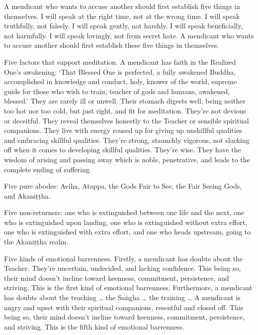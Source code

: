 \documentclass[12pt,openany]{book}%
\begin{document}
A mendicant who wants to accuse another should first establish five things in themselves. I will speak at the right time, not at the wrong time. I will speak truthfully, not falsely. I will speak gently, not harshly. I will speak beneficially, not harmfully. I will speak lovingly, not from secret hate. A mendicant who wants to accuse another should first establish these five things in themselves. 

Five factors that support meditation. A mendicant has faith in the Realized One’s awakening: ‘That Blessed One is perfected, a fully awakened Buddha, accomplished in knowledge and conduct, holy, knower of the world, supreme guide for those who wish to train, teacher of gods and humans, awakened, blessed.’ They are rarely ill or unwell. Their stomach digests well, being neither too hot nor too cold, but just right, and fit for meditation. They’re not devious or deceitful. They reveal themselves honestly to the Teacher or sensible spiritual companions. They live with energy roused up for giving up unskillful qualities and embracing skillful qualities. They’re strong, staunchly vigorous, not slacking off when it comes to developing skillful qualities. They’re wise. They have the wisdom of arising and passing away which is noble, penetrative, and leads to the complete ending of suffering. 

Five pure abodes: Aviha, Atappa, the Gods Fair to See, the Fair Seeing Gods, and \textsanskrit{Akaniṭṭha}. 

Five non-returners: one who is extinguished between one life and the next, one who is extinguished upon landing, one who is extinguished without extra effort, one who is extinguished with extra effort, and one who heads upstream, going to the \textsanskrit{Akaniṭṭha} realm. 

Five kinds of emotional barrenness. Firstly, a mendicant has doubts about the Teacher. They’re uncertain, undecided, and lacking confidence. This being so, their mind doesn’t incline toward keenness, commitment, persistence, and striving. This is the first kind of emotional barrenness. Furthermore, a mendicant has doubts about the teaching … the \textsanskrit{Saṅgha} … the training … A mendicant is angry and upset with their spiritual companions, resentful and closed off. This being so, their mind doesn’t incline toward keenness, commitment, persistence, and striving. This is the fifth kind of emotional barrenness. 
\end{document}
